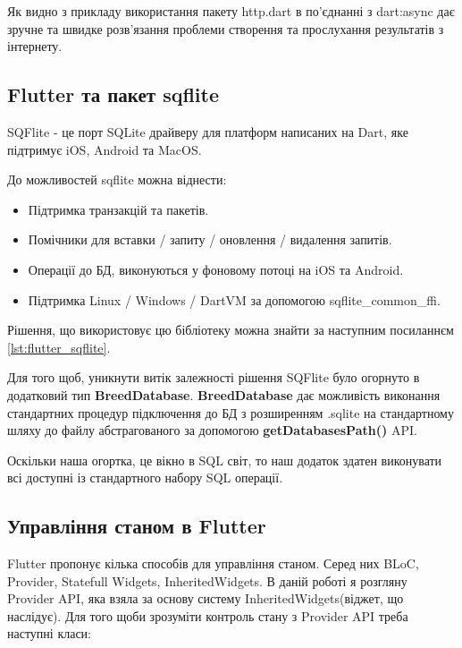 Як видно з прикладу використання пакету http.dart в по'єднанні з dart:async дає зручне
та швидке розв'язання проблеми створення та прослухання результатів з інтернету.

\subsection{Flutter та пакет sqflite}
\label{subsec:flutter_sqflite_theory}
SQFlite - це порт SQLite драйверу для платформ написаних на Dart, яке підтримує iOS, Android та MacOS.

До можливостей sqflite можна віднести:

\begin{itemize}
    \item Підтримка транзакцій та пакетів.
    \item Помічники для вставки / запиту / оновлення / видалення запитів.
    \item Операції до БД, виконуються у фоновому потоці на iOS та Android.
    \item Підтримка Linux / Windows / DartVM за допомогою sqflite_common_ffi.
\end{itemize}

Рішення, що використовує цю бібліотеку можна знайти за наступним посиланнєм \ref{lst:flutter_sqflite}.

Для того щоб, уникнути витік залежності рішення SQFlite було огорнуто в додатковий тип \textbf{BreedDatabase}.
\textbf{BreedDatabase} дає можливість виконання стандартних процедур підключення до БД з розширенням .sqlite
на стандартному шляху до файлу абстрагованого за допомогою \textbf{getDatabasesPath()} API.

Оскільки наша огортка, це вікно в SQL світ, то наш додаток здатен виконувати всі доступні із стандартного набору
SQL операції.

\subsection{Управління станом в Flutter}
\label{subsec:flutter_state_app}
Flutter пропонує кілька способів для управління станом. Серед них BLoC, Provider, Statefull Widgets, InheritedWidgets.
В даній роботі я розгляну Provider API, яка взяла за основу систему InheritedWidgets(віджет, що наслідує).
Для того щоби зрозуміти контроль стану з Provider API треба наступні класи:

